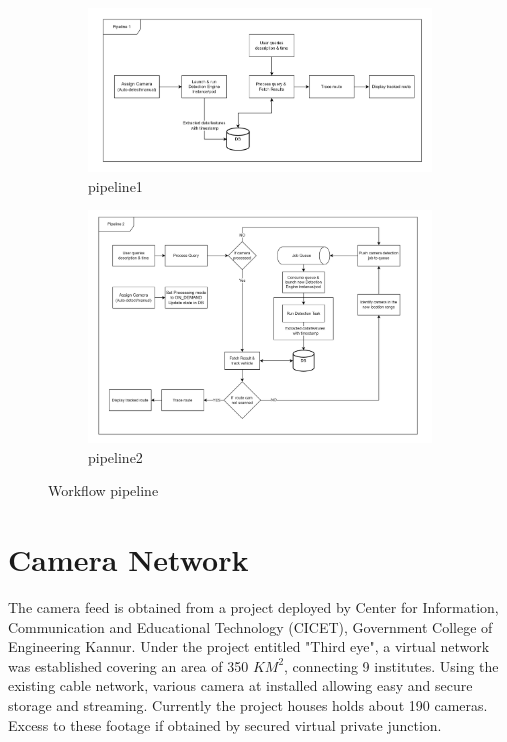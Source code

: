\begin{figure}[h!]
	\centering
	\begin{subfigure}[b]{0.8\linewidth}
		\centering
		\includegraphics[width=\linewidth]{Images/pipeline1}
		\caption{pipeline1}
		\label{fig:pipeline1}
	\end{subfigure}

	\begin{subfigure}[b]{0.8\linewidth}
		\centering
		\includegraphics[width=\linewidth]{Images/pipeline2}
		\caption{pipeline2}
		\label{fig:pipeline2}
	\end{subfigure}
	\caption{Workflow pipeline}
\end{figure}

\lipsum[1]


\section{Camera Network}
The camera feed is obtained from a project deployed by Center for Information, Communication and Educational Technology (CICET), Government College of Engineering Kannur. Under the project entitled "Third eye", a virtual network was established covering an area of 350 $KM^2$, connecting 9 institutes. Using the existing cable network, various camera at installed allowing easy and secure storage and streaming. Currently the project houses holds about 190 cameras. Excess to these footage if obtained by secured virtual private junction.

